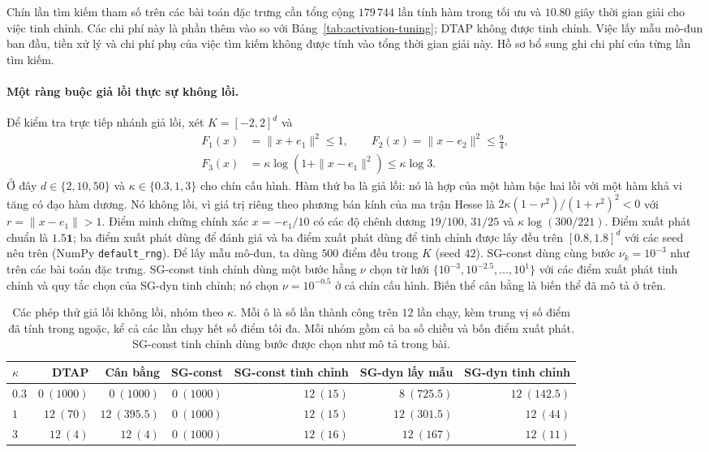 \documentclass[]{interact}
\theoremstyle{plain}
\theoremstyle{definition}
\theoremstyle{remark}
\begin{document}
Chín lần tìm kiếm tham số trên các bài toán đặc trưng cần tổng cộng $179\,744$ lần tính hàm trong tối ưu
và $10.80$ giây thời gian giải cho việc tinh chỉnh. Các chi phí này
là phần thêm vào so với Bảng~\ref{tab:activation-tuning}; DTAP không được tinh chỉnh.
Việc lấy mẫu mô-đun ban đầu, tiền xử lý và chi phí phụ của việc tìm kiếm không được tính
vào tổng thời gian giải này. Hồ sơ bổ sung ghi chi phí của
từng lần tìm kiếm.

\paragraph*{Một ràng buộc giả lồi thực sự không lồi.}
Để kiểm tra trực tiếp nhánh giả lồi, xét $K=[-2,2]^d$ và
\begin{equation}\label{eq:logball-test}
\begin{aligned}
 F_1(x)&=\|x+e_1\|^2\le1,\qquad
 F_2(x)=\|x-e_2\|^2\le\tfrac94,\\
 F_3(x)&=\kappa\log(1+\|x-e_1\|^2)\le \kappa\log3.
\end{aligned}
\end{equation}
Ở đây $d\in\{2,10,50\}$ và $\kappa\in\{0.3,1,3\}$ cho chín cấu hình.
Hàm thứ ba là giả lồi: nó là hợp của một hàm bậc hai lồi với một hàm khả vi tăng
có đạo hàm dương. Nó không
lồi, vì giá trị riêng theo phương bán kính của ma trận Hesse là
$2\kappa(1-r^2)/(1+r^2)^2<0$ với $r=\|x-e_1\|>1$.
Điểm minh chứng chính xác $x=-e_1/10$ có các độ chênh dương
$19/100$, $31/25$ và $\kappa\log(300/221)$.
Điểm xuất phát chuẩn là $1.5\mathbf1$; ba điểm xuất phát dùng để đánh giá và ba
điểm xuất phát dùng để tinh chỉnh được lấy đều trên $[0.8,1.8]^d$ với các seed nêu trên
(NumPy \texttt{default\_rng}).
Để lấy mẫu mô-đun, ta dùng $500$ điểm đều trong $K$ (seed $42$).
SG-const dùng cùng bước $\nu_k=10^{-3}$ như trên các bài toán đặc trưng. SG-const
tinh chỉnh dùng một bước hằng $\nu$ chọn từ lưới
$\{10^{-3},10^{-2.5},\ldots,10^1\}$ với các điểm xuất phát tinh chỉnh và quy tắc chọn của
SG-dyn tinh chỉnh; nó chọn $\nu=10^{-0.5}$ ở cả chín cấu hình. Biến thể cân bằng
là biến thể đã mô tả ở trên.

\begin{table}[t]
\centering\small
\setlength{\tabcolsep}{5pt}
\caption{Các phép thử giả lồi không lồi, nhóm theo $\kappa$.
Mỗi ô là số lần thành công trên $12$ lần chạy, kèm trung vị số
điểm đã tính trong ngoặc, kể cả các lần chạy hết số điểm tối đa. Mỗi nhóm
gồm cả ba số chiều và bốn điểm xuất phát. SG-const tinh chỉnh dùng bước
được chọn như mô tả trong bài.}
\label{tab:synthetic-scale}
\begin{tabular}{@{}lrrrrrr@{}}
\toprule
$\kappa$ & DTAP & Cân bằng & SG-const & SG-const tinh chỉnh & SG-dyn lấy mẫu & SG-dyn tinh chỉnh\\
\midrule
$0.3$ & $0\ (1000)$ & $0\ (1000)$ & $0\ (1000)$ & $12\ (15)$ & $8\ (725.5)$ & $12\ (142.5)$\\
$1$   & $12\ (70)$ & $12\ (395.5)$ & $0\ (1000)$ & $12\ (15)$ & $12\ (301.5)$ & $12\ (44)$\\
$3$   & $12\ (4)$ & $12\ (4)$ & $0\ (1000)$ & $12\ (16)$ & $12\ (167)$ & $12\ (11)$\\
\bottomrule
\end{tabular}
\end{table}
\end{document}
